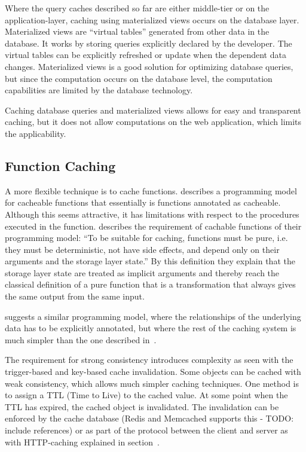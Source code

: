 Where the query caches described so far are either middle-tier or on the application-layer, caching using materialized views occurs on the database layer. Materialized views are “virtual tables” generated from other data in the database. It works by storing queries explicitly declared by the developer. The virtual tables can be explicitly refreshed or update when the dependent data changes. Materialized views is a good solution for optimizing database queries, but since the computation occurs on the database level, the computation capabilities are limited by the database technology.

Caching database queries and materialized views allows for easy and transparent caching, but it does not allow computations on the web application, which limits the applicability.



\subsection{Function Caching}


A more flexible technique is to cache functions. \cite{paper:liskov} describes a programming model for cacheable functions that essentially is functions annotated as cacheable. Although this seems attractive, it has limitations with respect to the procedures executed in the function. \cite{paper:liskov} describes the requirement of cachable functions of their programming model: “To be suitable for caching, functions must be pure, i.e. they must be deterministic, not have side effects, and depend only on their arguments and the storage layer state.” By this definition they explain that the storage layer state are treated as implicit arguments and thereby reach the classical definition of a pure function that is a transformation that always gives the same output from the same input.

\cite{paper:deploy-time} suggests a similar programming model, where the relationships of the underlying data has to be explicitly annotated, but where the rest of the caching system is much simpler than the one described in~\cite{paper:liskov}.

The requirement for strong consistency introduces complexity as seen with the trigger-based and key-based cache invalidation. Some objects can be cached with weak consistency, which allows much simpler caching techniques. One method is to assign a TTL (Time to Live) to the cached value. At some point when the TTL has expired, the cached object is invalidated. The invalidation can be enforced by the cache database (Redis and Memcached supports this - TODO: include references) or as part of the protocol between the client and server as with HTTP-caching explained in section~\cite{paper:web-caching-schemes}.

